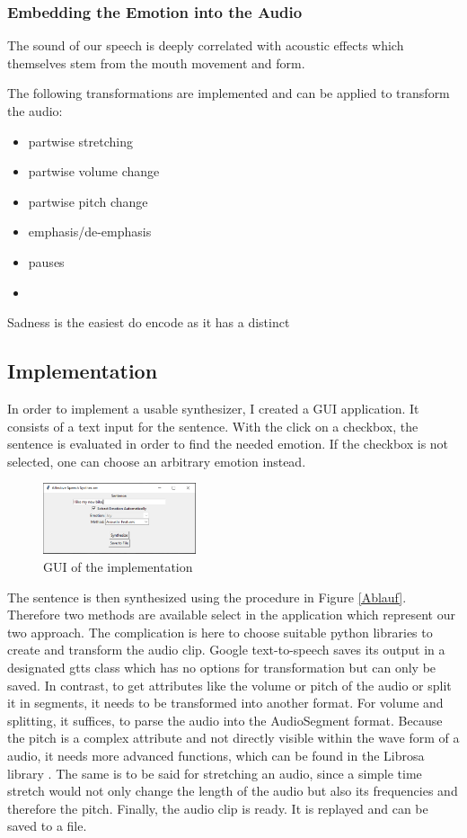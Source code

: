 \documentclass[11pt]{article}
\begin{document}
\subsubsection{Embedding the Emotion into the Audio}

The sound of our speech is deeply correlated with acoustic effects which themselves stem from the mouth movement and form\cite{arias_beyond_2020}. 

The following transformations are implemented and can be applied to transform the audio:
\begin{itemize}
\item partwise stretching
\item partwise volume change
\item partwise pitch change
\item emphasis/de-emphasis
\item pauses
\item
\end{itemize}

Sadness is the easiest do encode as it has a distinct


\subsection{Implementation}

In order to implement a usable synthesizer, I created a GUI application. It consists of a text input for the sentence. With the click on a checkbox, the sentence is evaluated in order to find the needed emotion. If the checkbox is not selected, one can choose an arbitrary emotion instead. 

\begin{figure}[h]
 \centering
\includegraphics[width=0.4\textwidth]{"Bilder/gui_v2.png"}
\caption{GUI of the implementation}
\end{figure}

The sentence is then synthesized using the procedure in Figure \ref{Ablauf}. Therefore two methods are available select in the application which represent our two approach. The complication is here to choose suitable python libraries to create and transform the audio clip. Google text-to-speech \cite{gtts} saves its output in a designated gtts class which has no options for transformation but can only be saved. In contrast, to get attributes like the volume or pitch of the audio or split it in segments, it needs to be transformed into another format. For volume and splitting, it suffices, to parse the audio into the AudioSegment format. Because the pitch is a complex attribute and not directly visible within the wave form of a audio, it needs more advanced functions, which can be found in the Librosa library \cite{McFee2015librosaAA}. The same is to be said for stretching an audio, since a simple time stretch would not only change the length of the audio but also its frequencies and therefore the pitch.
Finally, the audio clip is ready. It is replayed and can be saved to a file.
\end{document}
